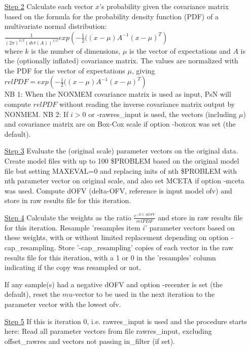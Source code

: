 \begin{itemize}
\item[\underline{Step 2}] 
Calculate each vector $x$’s probability 
given the covariance matrix based on the formula for the probability 
density function (PDF) of a multivariate normal distribution:\\
\begin{math}
\frac{1}{\left(2\pi\right)^{k/2}\left(det\left(A\right)\right)^{1/2}} exp\left(-\frac{1}{2}(\left(x-\mu\right)A^{-1} \left(x-\mu\right)^T\right)
\end{math}
\\
where $k$ is the number of dimensions, 
$\mu$ is the vector of expectations and $A$ is the (optionally inflated) covariance matrix.
The values are normalized with the PDF for the vector of expectations $\mu$, giving\\
\begin{math}
relPDF=exp\left(-\frac{1}{2}(\left(x-\mu\right)A^{-1} \left(x-\mu\right)^T\right)
\end{math}
\\
NB 1: When the NONMEM covariance matrix is used as input, PsN will compute $relPDF$ without reading the inverse covariance matrix
output by NONMEM.
NB 2: If $i>0$ or -rawres\_input is used, the vectors (including $\mu$) and covariance matrix are on Box-Cox scale if option -boxcox was set (the default).
\item[\underline{Step 3}] 
Evaluate the (original scale) parameter vectors on the original data.
Create model files with up to 100 \$PROBLEM based on the original model file but setting MAXEVAL=0
and replacing inits of nth \$PROBLEM with nth parameter vector on original scale, and also set MCETA if option -mceta was used. Compute dOFV 
(delta-OFV, reference is input model ofv) and store in raw results file for this iteration.
\item[\underline{Step 4}] 
Calculate the weights as the ratio $\frac{e^{-0.5\cdot dOFV}}{relPDF}$ and store in raw results file for this iteration. 
Resample 'resamples item $i$' parameter vectors based on these weights, with or without limited replacement depending on option 
-cap\_resampling.
Store '-cap\_resampling' copies of each vector in the raw results file for this iteration, with a 1 or 0 in the 'resamples'
column indicating if the copy was resampled or not.

\noindent If any sample(s) had a negative dOFV and option -recenter is set (the default), reset the $mu$-vector
to be used in the next iteration to the parameter vector with the lowest ofv.
\item[\underline{Step 5}]
If this is iteration $0$, i.e. rawres\_input is used and the procedure starts here: Read all parameter vectors
from file rawres\_input, excluding offset\_rawres and vectors not passing in\_filter (if set).


\end{itemize}
